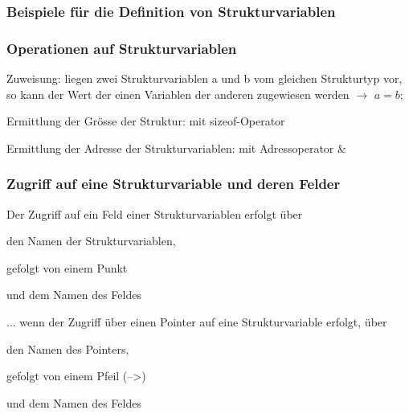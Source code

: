		\subsubsection{Beispiele für die Definition von Strukturvariablen}
			\vspace*{-0.2cm}
			
		\vspace*{0.3cm}		
		\subsubsection{Operationen auf Strukturvariablen}
			\begin{compactitem}
				\item Zuweisung: liegen zwei Strukturvariablen a und b vom gleichen Strukturtyp vor, so kann der Wert der einen Variablen der anderen zugewiesen werden $\rightarrow$ $a=b;$
				\item Ermittlung der Grösse der Struktur: mit sizeof-Operator
				\item Ermittlung der Adresse der Strukturvariablen: mit Adressoperator \&
			\end{compactitem}
		\subsubsection{Zugriff auf eine Strukturvariable und deren Felder}
			Der Zugriff auf ein Feld einer Strukturvariablen erfolgt über
			\begin{compactitem}
				\item den Namen der Strukturvariablen,
				\item gefolgt von einem Punkt
				\item und dem Namen des Feldes 
			\end{compactitem}			
			\vspace*{0.2cm}
			... wenn der Zugriff über einen Pointer auf eine Strukturvariable erfolgt, über
			\begin{compactitem}
				\item den Namen des Pointers,
				\item gefolgt von einem Pfeil (--\textgreater)
				\item und dem Namen des Feldes 
			\end{compactitem}
		\newpage				

